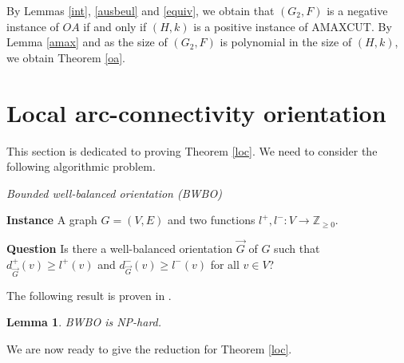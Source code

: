 \documentclass[a4paper,12pt,makeidx]{article}
\newtheorem{lemma}{Lemma}
\begin{document}
By Lemmas \ref{int}, \ref{ausbeul} and \ref{equiv}, we obtain that $(G_2,F)$ is a negative instance of $OA$ if and only if $(H,k)$ is a positive instance of AMAXCUT. By Lemma \ref{amax} and as the size of $(G_2,F)$ is polynomial in the size of $(H,k)$, we obtain Theorem \ref{oa}.

\section{Local arc-connectivity orientation}\label{local}
This section is dedicated to proving Theorem \ref{loc}. We need to consider the following algorithmic problem.

\medskip
{\it Bounded well-balanced orientation (BWBO)}

\smallskip
{\bf Instance} A graph $G=(V, E)$ and two functions $l^+,l^-:V \rightarrow \mathbb{Z}_{\geq 0}$.

\smallskip
{\bf Question} Is there a well-balanced orientation $\vec{G}$ of $G$ such that $d_{\vec{G}}^+(v)\geq l^+(v)$ and $d_{\vec{G}}^-(v)\geq l^-(v)$ for all $v \in V$?
\medskip

The following result is proven in \cite{bikks}.
\begin{lemma}
BWBO is NP-hard.
\end{lemma}

We are now ready to give the reduction for Theorem \ref{loc}.
\end{document}
